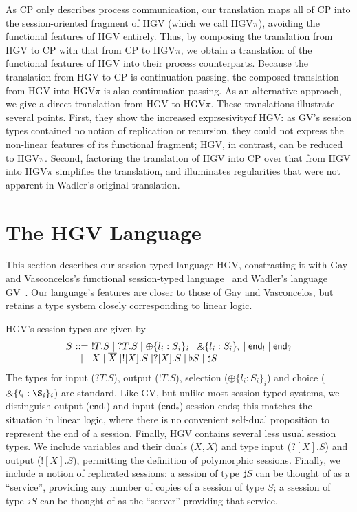 \documentclass{easychair}
\makeatletter
\newcommand{\ba}{\begin{array}}
\newcommand{\ea}{\end{array}}
\newenvironment{eqs}{\ba{@{}r@{~}c@{~}l@{}}}{\ea}
\newcommand{\key}{\mathsf}
\newcommand{\set}[1]{\{ #1 \}}
\newcommand{\row}[2]{\set{#1}_{#2}}
\newcommand{\gvOutput}[2]{\mathord{!}{#1}.{#2}}
\newcommand{\gvInput}[2]{\mathord{?}{#1}.{#2}}
\newcommand{\gvEndOutput}{\key{end}_!}
\newcommand{\gvEndInput}{\key{end}_?}
\newcommand{\gvPlus}[2]{\oplus \row{#1}{#2}}
\newcommand{\gvChoice}[2]{\binampersand \row{#1}{#2}}
\newcommand{\gvServer}[1]{\flat {#1}}
\newcommand{\gvService}[1]{\sharp {#1}}
\newcommand{\gvDual}[1]{\overline{#1}}
\newcommand{\gvOutputType}[2]{![{#1}].{#2}}
\newcommand{\gvInputType}[2]{?[{#1}].{#2}}
\newcommand{\la}{l}
\newcommand{\hgv}{HGV\xspace}
\newcommand{\hgvpi}{HGV$\pi$\xspace}
\makeatother
\begin{document}
As CP only describes process communication, our translation maps all of CP into the session-oriented
fragment of HGV (which we call \hgvpi), avoiding the functional features of \hgv entirely.  Thus, by
composing the translation from \hgv to CP with that from CP to \hgvpi, we obtain a translation of
the functional features of \hgv into their process counterparts.  Because the translation from \hgv
to CP is continuation-passing, the composed translation from \hgv into \hgvpi is also
continuation-passing.  As an alternative approach, we give a direct translation from \hgv to \hgvpi.
These translations illustrate several points.  First, they show the increased exprsesivityof \hgv:
as GV's session types contained no notion of replication or recursion, they could not express the
non-linear features of its functional fragment; \hgv, in contrast, can be reduced to \hgvpi.
Second, factoring the translation of \hgv into CP over that from \hgv into \hgvpi simplifies the
translation, and illuminates regularities that were not apparent in Wadler's original translation.

\section{The \hgv Language}

This section describes our session-typed language \hgv, constrasting it with Gay and Vasconcelos's
functional session-typed language~\cite{GayVasconcelos10} and Wadler's language GV~\cite{Wadler12}.
Our language's features are closer to those of Gay and Vasconcelos, but retains a type system
closely corresponding to linear logic.

\hgv's session types are given by
\[\begin{eqs}
  S & ::= & \gvOutput{T}{S} \mid \gvInput{T}{S} \mid
           \gvPlus{\la_i:S_i}{i} \mid \gvChoice{\la_i:S_i}{i} \mid
           \gvEndOutput \mid \gvEndInput \\
    & \mid & X \mid \gvDual{X} \mid
            \gvOutputType{X}{S} \mid \gvInputType{X}{S} \mid
            \gvServer{S} \mid \gvService{S}
\end{eqs}\]
The types for input ($\gvInput{T}{S}$), output ($\gvOutput{T}{S}$), selection
($\gvPlus{\la_i:S_i}{i}$) and choice ($\gvChoice{\la_i:\S_i}{i}$) are standard.  Like GV, but unlike
most session typed systems, we distinguish output ($\gvEndOutput$) and input ($\gvEndInput$) session
ends; this matches the situation in linear logic, where there is no convenient self-dual proposition
to represent the end of a session.  Finally, \hgv contains several less usual session types.  We
include variables and their duals ($X,\gvDual{X}$) and type input ($\gvInputType{X}{S}$) and output
($\gvOutputType{X}{S}$), permitting the definition of polymorphic sessions.  Finally, we include a
notion of replicated sessions: a session of type $\gvService{S}$ can be thought of as a ``service'',
providing any number of copies of a session of type $S$; a ssession of type $\gvServer{S}$ can be
thought of as the ``server'' providing that service.
\end{document}
